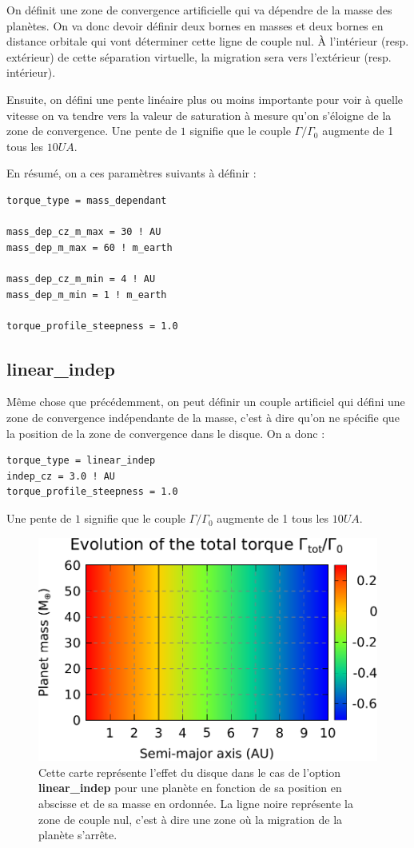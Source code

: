 On définit une zone de convergence artificielle qui va dépendre de la masse des planètes. On va donc devoir définir deux bornes en masses et deux bornes en distance orbitale qui vont déterminer cette ligne de couple nul. À l'intérieur (resp. extérieur) de cette séparation virtuelle, la migration sera vers l'extérieur (resp. intérieur).

Ensuite, on défini une pente linéaire plus ou moins importante pour voir à quelle vitesse on va tendre vers la valeur de saturation à mesure qu'on s'éloigne de la zone de convergence. Une pente de $1$ signifie que le couple $\Gamma/\Gamma_0$ augmente de 1 tous les $10\unit{UA}$.

En résumé, on a ces paramètres suivants à définir : 
\begin{verbatim}
torque_type = mass_dependant

mass_dep_cz_m_max = 30 ! AU
mass_dep_m_max = 60 ! m_earth

mass_dep_cz_m_min = 4 ! AU
mass_dep_m_min = 1 ! m_earth

torque_profile_steepness = 1.0
\end{verbatim}

\subsection{linear\_indep}\label{sec:linear_indep}
Même chose que précédemment, on peut définir un couple artificiel qui défini une zone de convergence indépendante de la masse, c'est à dire qu'on ne spécifie que la position de la zone de convergence dans le disque. On a donc : 
\begin{verbatim}
torque_type = linear_indep
indep_cz = 3.0 ! AU
torque_profile_steepness = 1.0
\end{verbatim}

Une pente de $1$ signifie que le couple $\Gamma/\Gamma_0$ augmente de 1 tous les $10\unit{UA}$.

\begin{figure}[htbp]
\centering
\includegraphics[width=0.65\linewidth]{figure/migration_map/linear_indep.pdf}
\caption{Cette carte représente l'effet du disque dans le cas de l'option \textbf{linear\_indep} pour une planète en fonction de sa position en abscisse et de sa masse en ordonnée. La ligne noire représente la zone de couple nul, c'est à dire une zone où la migration de la planète s'arrête.}
\end{figure}

